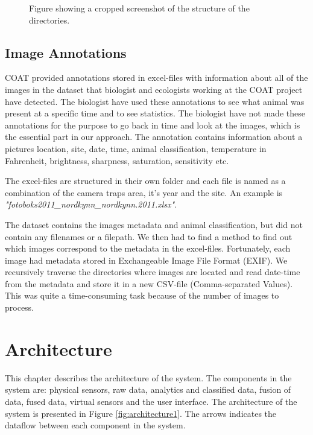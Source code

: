 \documentclass[USenglish]{uit-thesis}
\begin{document}
\begin{figure}
\caption{Figure showing a cropped screenshot of the structure of the directories.}
\label{fig:directories}
\end{figure}

\section{Image Annotations}

COAT provided annotations stored in excel-files with information about all of the images in the dataset that biologist and ecologists working at the COAT project have detected. The biologist have used these annotations to see what animal was present at a specific time and to see statistics. The biologist have not made these annotations for the purpose to go back in time and look at the images, which is the essential part in our approach.
The annotation contains information about a pictures location, site, date, time, animal classification, temperature in Fahrenheit, brightness, sharpness, saturation, sensitivity etc. 
 
The excel-files are structured in their own folder and each file is named as a combination of the camera traps area, it's year and the site. An example is \textit{"fotoboks2011\_nordkynn\_nordkynn.2011.xlsx"}.


The dataset contains the images metadata and animal classification, but did not contain any filenames or a filepath. We then had to find a method to find out which images correspond to the metadata in the excel-files. Fortunately, each image had metadata stored in Exchangeable Image File Format (EXIF). We recursively traverse the directories where images are located and read date-time from the metadata and store it in a new CSV-file (Comma-separated Values).
This was quite a time-consuming task because of the number of images to process.


\chapter{Architecture}
This chapter describes the architecture of the system.
The components in the system are: physical sensors, raw data, analytics and classified data, fusion of data, fused data, virtual sensors and the user interface. 
The architecture of the system is presented in Figure \ref{fig:architecture1}. The arrows indicates the dataflow between each component in the system.
\end{document}
